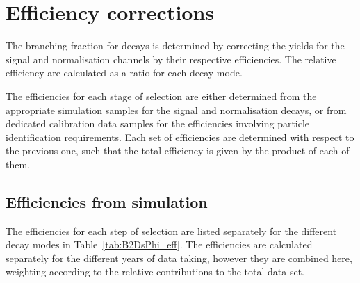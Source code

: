 \section{Efficiency corrections}
\label{sec:B2DsPhi_effcorrections}

The branching fraction for \decay{\Bp}{\Dsp\phiz} decays is determined by correcting the yields for the signal and normalisation channels by their respective efficiencies. 
The relative efficiency are calculated as a ratio for each \Dsp decay mode.    

The efficiencies for each stage of selection are either determined from the appropriate simulation samples for the signal and normalisation decays, or from dedicated calibration data samples for the efficiencies involving particle identification requirements. 
Each set of efficiencies are determined with respect to the previous one, such that the total efficiency is given by the product of each of them.


\subsection{Efficiencies from simulation}

The efficiencies for each step of selection are listed separately for the different \Dsp decay modes in Table~\ref{tab:B2DsPhi_eff}. 
The efficiencies are calculated separately for the different years of data taking, however they are combined here, weighting according to the relative contributions to the total data set. 


